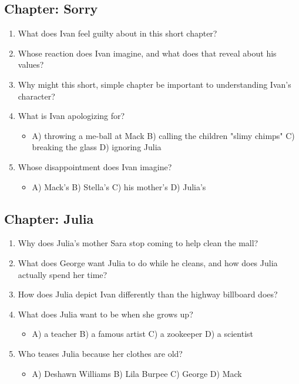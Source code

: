 \documentclass[11pt]{article}
\begin{document}
\subsection*{Chapter: Sorry}
\begin{enumerate}
  \item What does Ivan feel guilty about in this short chapter?
  \vspace{0.5in}
  \item Whose reaction does Ivan imagine, and what does that reveal about his values?
  \vspace{0.5in}
  \item Why might this short, simple chapter be important to understanding Ivan's character?
  \vspace{0.5in}
  \item What is Ivan apologizing for?
  \begin{itemize}\setlength\itemsep{0pt}
    \item[] A) throwing a me-ball at Mack \quad B) calling the children "slimy chimps" \quad C) breaking the glass \quad D) ignoring Julia
  \end{itemize}
  \item Whose disappointment does Ivan imagine?
  \begin{itemize}\setlength\itemsep{0pt}
    \item[] A) Mack's \quad B) Stella's \quad C) his mother's \quad D) Julia's
  \end{itemize}
\end{enumerate}

\subsection*{Chapter: Julia}
\begin{enumerate}
  \item Why does Julia's mother Sara stop coming to help clean the mall?
  \vspace{0.5in}
  \item What does George want Julia to do while he cleans, and how does Julia actually spend her time?
  \vspace{0.5in}
  \item How does Julia depict Ivan differently than the highway billboard does?
  \vspace{0.5in}
  \item What does Julia want to be when she grows up?
  \begin{itemize}\setlength\itemsep{0pt}
    \item[] A) a teacher \quad B) a famous artist \quad C) a zookeeper \quad D) a scientist
  \end{itemize}
  \item Who teases Julia because her clothes are old?
  \begin{itemize}\setlength\itemsep{0pt}
    \item[] A) Deshawn Williams \quad B) Lila Burpee \quad C) George \quad D) Mack
  \end{itemize}
\end{enumerate}
\end{document}
